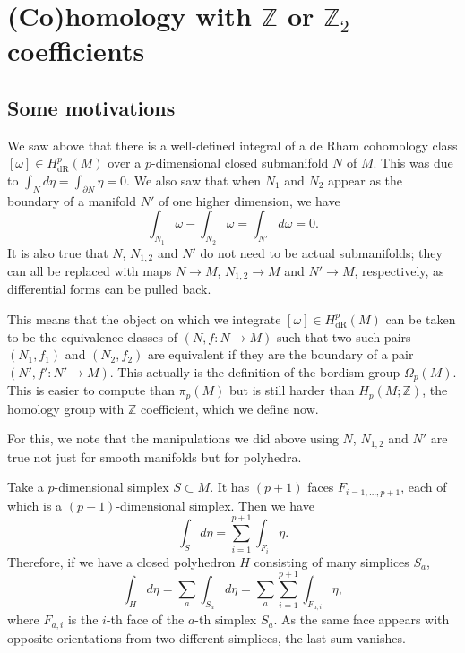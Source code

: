 \documentclass[12pt]{article}
\numberwithin{equation}{section}
\theoremstyle{remark}
\def\bZ{\mathbb{Z}}
\begin{document}
\section{(Co)homology with $\bZ$ or $\bZ_2$ coefficients}

\subsection{Some motivations}
We saw above that there is a well-defined integral of a de Rham cohomology class $[\omega]\in H^p_\text{dR}(M)$ 
over a $p$-dimensional closed submanifold $N$ of $M$.
This was due to $\int_N d\eta=\int_{\partial N}\eta=0$.
We also saw that when $N_1$ and $N_2$ appear as the boundary of a manifold $N'$ of one higher dimension, we have \begin{equation}
\int_{N_1} \omega - \int_{N_2} \omega = \int_{N'} d\omega = 0.
\end{equation}
It is also true that $N$, $N_{1,2}$ and $N'$ do not need to be actual submanifolds;
they can all be replaced with maps $N\to M$, $N_{1,2}\to M$ and $N'\to M$, respectively,
as differential forms can be pulled back.

This means that the object on which we integrate $[\omega]\in H^p_\text{dR}(M)$ 
can be taken to be the equivalence classes of $(N, f:N\to M)$
such that two such pairs $(N_1,f_1)$ and $(N_2,f_2)$ are equivalent if they are the boundary of a pair $(N',f':N'\to M)$.
This actually is the definition of the bordism group $\Omega_p(M)$.
This is easier to compute than $\pi_p(M)$ but is still harder than $H_p(M;\bZ)$, the homology group with $\bZ$ coefficient, which we define now.

For this, we note that the manipulations we did above using $N$, $N_{1,2}$ and $N'$ 
are true not just for smooth manifolds but for polyhedra.

Take a $p$-dimensional simplex $S \subset M$.
It has $(p+1)$ faces $F_{i=1,\ldots,p+1}$, each of which is a $(p-1)$-dimensional simplex.
Then we have \begin{equation}
\int_S d\eta = \sum_{i=1}^{p+1}  \int_{F_i} \eta.
\end{equation}
Therefore, if we have a closed polyhedron $H$ consisting of many simplices $S_a$, \begin{equation}
\int_H d\eta = \sum_a \int_{S_a} d\eta = \sum_a \sum_{i=1}^{p+1}  \int_{F_{a,i}} \eta,
\end{equation}
where $F_{a,i}$ is the $i$-th face of the $a$-th simplex $S_a$.
As the same face appears with opposite orientations from two different simplices, the last sum vanishes. 
\end{document}
